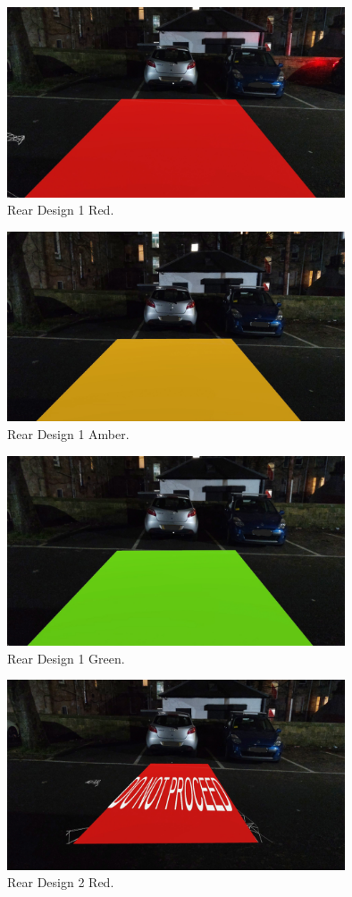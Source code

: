 \documentclass{l4proj}
\begin{document}
\begin{figure}[H]
    \centering
    \includegraphics[width=10cm]{images/design1.1.jpg}
    \caption{Rear Design 1 Red.}
    \label{fig:real_rear_1}
\end{figure}

\begin{figure}[H]
    \centering
    \includegraphics[width=10cm]{images/design1.2.jpg}
    \caption{Rear Design 1 Amber.}
    \label{fig:real_rear_2}
\end{figure}

\begin{figure}[H]
    \centering
    \includegraphics[width=10cm]{images/design1.3.jpg}
    \caption{Rear Design 1 Green.}
    \label{fig:real_rear_3}
\end{figure}

\begin{figure}[H]
    \centering
    \includegraphics[width=10cm]{images/design2.1.jpg}
    \caption{Rear Design 2 Red.}
    \label{fig:real_rear_4}
\end{figure}
\end{document}
